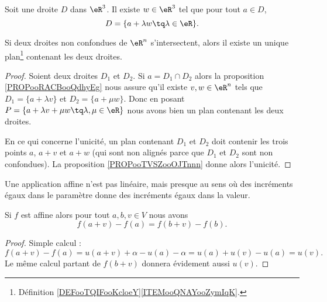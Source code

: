 \begin{proposition}	\label{PROPooRACBooQdhyEg}
	Soit une droite \( D\) dans \( \eR^3\). Il existe \( w\in \eR^3\) tel que pour tout \( a\in D\),
	\begin{equation}
		D=\{ a+\lambda w\tq \lambda\in \eR \}.
	\end{equation}
\end{proposition}


\begin{proposition}	\label{PROPooQZGVooLTtyQT}
	Si deux droites non confondues de \( \eR^n\) s'intersectent, alors il existe un unique plan\footnote{Définition \ref{DEFooTQIFooKcloeY}\ref{ITEMooQNAYooZymIqK}.} contenant les deux droites.
\end{proposition}

\begin{proof}
	Soient deux droites \( D_1\) et \( D_2\). Si \( a=D_1\cap D_2\) alors la proposition \ref{PROPooRACBooQdhyEg} nous assure qu'il existe \( v,w\in \eR^n\) tels que \( D_1=\{ a+\lambda v \}\) et \( D_2=\{ a+\mu w \}\). Donc en posant \( P=\{ a+\lambda v+\mu w\tq \lambda,\mu\in \eR \}\) nous avons bien un plan contenant les deux droites.

	En ce qui concerne l'unicité, un plan contenant \( D_1\) et \( D_2\) doit contenir les trois points \( a\), \( a+v\) et \( a+w\) (qui sont non alignés parce que \( D_1\) et \( D_2\) sont non confondues). La proposition \ref{PROPooTVSZooOJTnnn} donne alors l'unicité.
\end{proof}


Une application affine n'est pas linéaire, mais presque au sens où des incréments égaux dans le paramètre donne des incréments égaux dans la valeur.
\begin{lemma}       \label{LEMooEQEAooQaFCMW}
	Si \( f\) est affine alors pour tout \( a,b,v\in V\) nous avons
	\begin{equation}
		f(a+v)-f(a)=f(b+v)-f(b).
	\end{equation}
\end{lemma}

\begin{proof}
	Simple calcul :
	\begin{equation}
		f(a+v)-f(a)=u(a+v)+\alpha-u(a)-\alpha=u(a)+u(v)-u(a)=u(v).
	\end{equation}
	Le même calcul partant de \( f(b+v)\) donnera évidement aussi \( u(v)\).
\end{proof}


